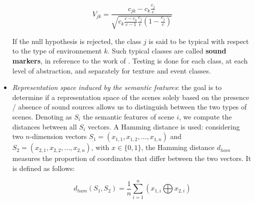 \documentclass[12pt]{elsarticle}
\begin{document}
\begin{itemize}
\begin{equation}
V_{jk}=\dfrac{c_{jk}-c_k\frac{c_j}{c}}{\sqrt{c_k\frac{c-c_k}{c-1}\frac{c_j}{c}(1-\frac{c_j}{c})}}
\end{equation}

 
If the null hypothesis is rejected, the class $j$ is said to be typical with respect to the type of environnement $k$. Such typical classes are called \textbf{sound markers}, in reference to the work of \cite{schafer1993soundscape}. Testing is done for each class, at each level of abstraction, and separately for texture and event classes.


\item \emph{Representation space induced by the semantic features}: the goal is to determine if a representation space of the scenes solely based on the presence / absence of sound sources allows us to distinguish between the two types of scenes. Denoting as $S_i$ the semantic features of scene $i$, we compute the distances between all $S_i$ vectors. A Hamming distance is used: considering two $n$-dimension vectors $S_1=(x_{1,1},x_{1,2},\ldots,x_{1,n})$ and $S_2=(x_{2,1},x_{2,2},\ldots,x_{2,n})$, with $x \in\lbrace 0,1\rbrace$, the Hamming distance $d_{ham}$ measures the proportion of coordinates that differ between the two vectors. It is defined as follows:

\begin{equation}
d_{ham}(S_1,S_2)=\dfrac{1}{n}\sum_{i=1}^{n} (x_{1,i} \bigoplus x_{2,i})
\end{equation}


\end{itemize}
\end{document}
